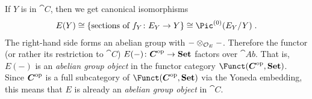 \documentclass[a4paper,parskip=half,numbers=enddot, DIV=12]{scrreprt}
\begin{document}
\begin{rem}
	If $Y$ is in $\cat C$, then we get canonical isomorphisms
	\begin{align*}
		E(Y)\cong\left\{\text{sections of }f_Y\colon E_Y\to Y\right\}\cong\Pic^{(0)}(E_Y/Y)\;.
	\end{align*}
	The right-hand side forms an abelian group with $-\otimes_{\mathcal{O}_E}-$. Therefore the functor (or rather its restriction to $\cat C$) $E(-)\colon \cat C^\op\morphism\cat{Set}$ factors over $\cat{Ab}$. That is, $E(-)$ is an \emph{abelian group object} in the functor category $\Funct(\cat{C}^\op,\cat{Set})$. Since $\cat C^\op$ is a full subcategory of $\Funct(\cat{C}^\op,\cat{Set})$ via the Yoneda embedding, this means that $E$ is already an \emph{abelian group object} in $\cat C$.
	

\end{rem}
\end{document}
